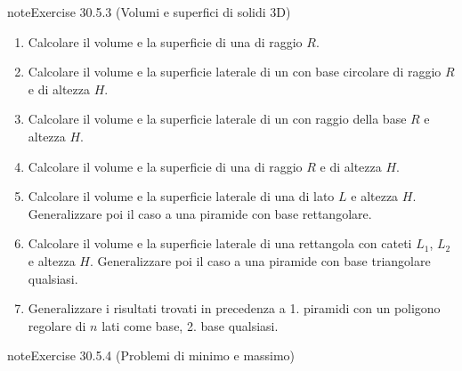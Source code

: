 \documentclass[letterpaper,10pt,italian]{jupyterBook}
\begin{document}
\begin{sphinxadmonition}{note}{Exercise 30.5.3 (Volumi e superfici di solidi \sphinxhyphen{} 3D)}


\begin{enumerate}
%
\item {} 
\sphinxAtStartPar
Calcolare il volume e la superficie di una  di raggio \(R\). 

\item {} 
\sphinxAtStartPar
Calcolare il volume e la superficie laterale di un  con base circolare di raggio \(R\) e di altezza \(H\).

\item {} 
\sphinxAtStartPar
Calcolare il volume e la superficie laterale di un  con raggio della base \(R\) e altezza \(H\).

\item {} 
\sphinxAtStartPar
Calcolare il volume e la superficie di una  di raggio \(R\) e di altezza \(H\).

\item {} 
\sphinxAtStartPar
Calcolare il volume e la superficie laterale di una  di lato \(L\) e altezza \(H\). Generalizzare poi il caso a una piramide con base rettangolare.

\item {} 
\sphinxAtStartPar
Calcolare il volume e la superficie laterale di una  rettangola con cateti \(L_1\), \(L_2\) e altezza \(H\). Generalizzare poi il caso a una piramide con base triangolare qualsiasi.

\item {} 
\sphinxAtStartPar
Generalizzare i risultati trovati in precedenza a 1. piramidi con un poligono regolare di \(n\) lati come base, 2. base qualsiasi.

\end{enumerate}
\end{sphinxadmonition}
 \label{exercise:ch/vector-calculus/problems-exercise-3}

\begin{sphinxadmonition}{note}{Exercise 30.5.4 (Problemi di minimo e massimo)}


\end{sphinxadmonition}
\end{document}
